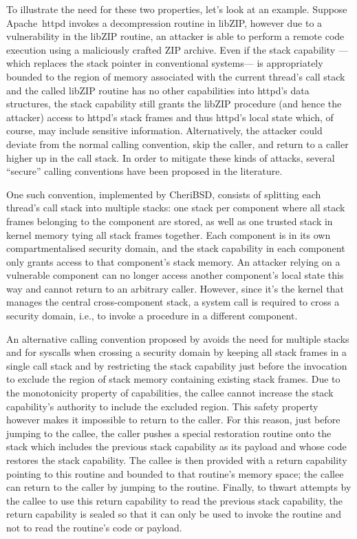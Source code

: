 \documentclass[main.tex]{subfiles}
\begin{document}
To illustrate the need for these two properties, let’s look at an example. Suppose Apache httpd invokes a decompression routine in libZIP, however due to a vulnerability in the libZIP routine, an attacker is able to perform a remote code execution using a maliciously crafted ZIP archive. Even if the stack capability —which replaces the stack pointer in conventional systems— is appropriately bounded to the region of memory associated with the current thread’s call stack and the called libZIP routine has no other capabilities into httpd’s data structures, the stack capability still grants the libZIP procedure (and hence the attacker) access to httpd’s stack frames and thus httpd’s local state which, of course, may include sensitive information. Alternatively, the attacker could deviate from the normal calling convention, skip the caller, and return to a caller higher up in the call stack. In order to mitigate these kinds of attacks, several “secure” calling conventions have been proposed in the literature.

One such convention, implemented by CheriBSD, consists of splitting each thread’s call stack into multiple stacks: one stack per component where all stack frames belonging to the component are stored, as well as one trusted stack in kernel memory tying all stack frames together. Each component is in its own compartmentalised security domain, and the stack capability in each component only grants access to that component’s stack memory. An attacker relying on a vulnerable component can no longer access another component’s local state this way and cannot return to an arbitrary caller. However, since it’s the kernel that manages the central cross-component stack, a system call is required to cross a security domain, i.e., to invoke a procedure in a different component.

An alternative calling convention proposed by \cite{retptr} avoids the need for multiple stacks and for syscalls when crossing a security domain by keeping all stack frames in a single call stack and by restricting the stack capability just before the invocation to exclude the region of stack memory containing existing stack frames. Due to the monotonicity property of capabilities, the callee cannot increase the stack capability’s authority to include the excluded region. This safety property however makes it impossible to return to the caller. For this reason, just before jumping to the callee, the caller pushes a special restoration routine onto the stack which includes the previous stack capability as its payload and whose code restores the stack capability. The callee is then provided with a return capability pointing to this routine and bounded to that routine’s memory space; the callee can return to the caller by jumping to the routine. Finally, to thwart attempts by the callee to use this return capability to read the previous stack capability, the return capability is sealed so that it can only be used to invoke the routine and not to read the routine’s code or payload.
\end{document}
